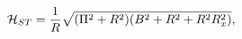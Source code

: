 \begin{equation}
\label{ST0}
{\cal H}_{ST} = \frac{1}{R}
\sqrt{(\Pi^2 + R^2) (B^2 + R^2 + R^2 R_x^2)},
\end{equation}

